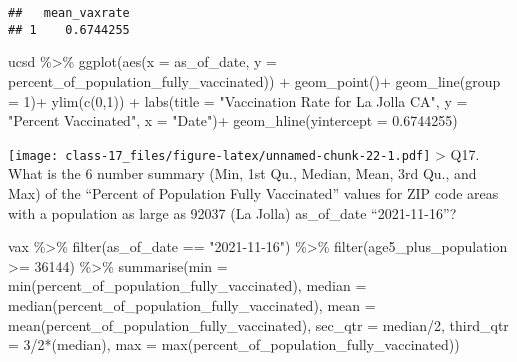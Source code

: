 \documentclass[
]{article}
\newenvironment{Shaded}{\begin{snugshade}}{\end{snugshade}}
\newcommand{\AttributeTok}[1]{\textcolor[rgb]{0.77,0.63,0.00}{#1}}
\newcommand{\DecValTok}[1]{\textcolor[rgb]{0.00,0.00,0.81}{#1}}
\newcommand{\FloatTok}[1]{\textcolor[rgb]{0.00,0.00,0.81}{#1}}
\newcommand{\FunctionTok}[1]{\textcolor[rgb]{0.00,0.00,0.00}{#1}}
\newcommand{\NormalTok}[1]{#1}
\newcommand{\SpecialCharTok}[1]{\textcolor[rgb]{0.00,0.00,0.00}{#1}}
\newcommand{\StringTok}[1]{\textcolor[rgb]{0.31,0.60,0.02}{#1}}
\begin{document}
\begin{verbatim}
##   mean_vaxrate
## 1    0.6744255
\end{verbatim}

\begin{Shaded}
\begin{Highlighting}[]
\NormalTok{ucsd }\SpecialCharTok{\%\textgreater{}\%} 
  \FunctionTok{ggplot}\NormalTok{(}\FunctionTok{aes}\NormalTok{(}\AttributeTok{x =}\NormalTok{ as\_of\_date, }\AttributeTok{y =}\NormalTok{ percent\_of\_population\_fully\_vaccinated)) }\SpecialCharTok{+}
  \FunctionTok{geom\_point}\NormalTok{()}\SpecialCharTok{+}
  \FunctionTok{geom\_line}\NormalTok{(}\AttributeTok{group =} \DecValTok{1}\NormalTok{)}\SpecialCharTok{+}
  \FunctionTok{ylim}\NormalTok{(}\FunctionTok{c}\NormalTok{(}\DecValTok{0}\NormalTok{,}\DecValTok{1}\NormalTok{)) }\SpecialCharTok{+}
  \FunctionTok{labs}\NormalTok{(}\AttributeTok{title =} \StringTok{"Vaccination Rate for La Jolla CA"}\NormalTok{, }\AttributeTok{y =} \StringTok{"Percent Vaccinated"}\NormalTok{, }\AttributeTok{x =} \StringTok{"Date"}\NormalTok{)}\SpecialCharTok{+}
  \FunctionTok{geom\_hline}\NormalTok{(}\AttributeTok{yintercept =} \FloatTok{0.6744255}\NormalTok{)}
\end{Highlighting}
\end{Shaded}

\texttt{[image: class-17\_files/figure-latex/unnamed-chunk-22-1.pdf]}
\textgreater{} Q17. What is the 6 number summary (Min, 1st Qu., Median,
Mean, 3rd Qu., and Max) of the ``Percent of Population Fully
Vaccinated'' values for ZIP code areas with a population as large as
92037 (La Jolla) as\_of\_date ``2021-11-16''?

\begin{Shaded}
\begin{Highlighting}[]
\NormalTok{vax }\SpecialCharTok{\%\textgreater{}\%} 
  \FunctionTok{filter}\NormalTok{(as\_of\_date }\SpecialCharTok{==} \StringTok{"2021{-}11{-}16"}\NormalTok{) }\SpecialCharTok{\%\textgreater{}\%} 
  \FunctionTok{filter}\NormalTok{(age5\_plus\_population }\SpecialCharTok{\textgreater{}=} \DecValTok{36144}\NormalTok{) }\SpecialCharTok{\%\textgreater{}\%} 
  \FunctionTok{summarise}\NormalTok{(}\AttributeTok{min =} \FunctionTok{min}\NormalTok{(percent\_of\_population\_fully\_vaccinated), }\AttributeTok{median =} \FunctionTok{median}\NormalTok{(percent\_of\_population\_fully\_vaccinated), }\AttributeTok{mean =} \FunctionTok{mean}\NormalTok{(percent\_of\_population\_fully\_vaccinated), }\AttributeTok{sec\_qtr =}\NormalTok{ median}\SpecialCharTok{/}\DecValTok{2}\NormalTok{, }\AttributeTok{third\_qtr =} \DecValTok{3}\SpecialCharTok{/}\DecValTok{2}\SpecialCharTok{*}\NormalTok{(median),  }\AttributeTok{max =} \FunctionTok{max}\NormalTok{(percent\_of\_population\_fully\_vaccinated))}
\end{Highlighting}
\end{Shaded}
\end{document}
